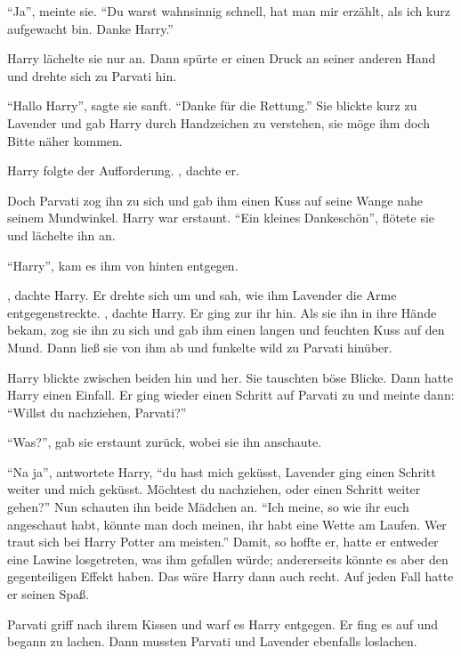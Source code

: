 \enquote{Ja}, meinte sie. \enquote{Du warst wahnsinnig schnell, hat man mir erzählt, als ich kurz aufgewacht bin. Danke Harry.}

Harry lächelte sie nur an. Dann spürte er einen Druck an seiner anderen Hand und drehte sich zu Parvati hin.

\enquote{Hallo Harry}, sagte sie sanft. \enquote{Danke für die Rettung.} Sie blickte kurz zu Lavender und gab Harry durch Handzeichen zu verstehen, sie möge ihm doch Bitte näher kommen.

Harry folgte der Aufforderung. , dachte er.

Doch Parvati zog ihn zu sich und gab ihm einen Kuss auf seine Wange nahe seinem Mundwinkel. Harry war erstaunt. \enquote{Ein kleines Dankeschön}, flötete sie und lächelte ihn an.

\enquote{Harry}, kam es ihm von hinten entgegen.

, dachte Harry. Er drehte sich um und sah, wie ihm Lavender die Arme entgegenstreckte. , dachte Harry. Er ging zur ihr hin. Als sie ihn in ihre Hände bekam, zog sie ihn zu sich und gab ihm einen langen und feuchten Kuss auf den Mund. Dann ließ sie von ihm ab und funkelte wild zu Parvati hinüber.

Harry blickte zwischen beiden hin und her. Sie tauschten böse Blicke. Dann hatte Harry einen Einfall. Er ging wieder einen Schritt auf Parvati zu und meinte dann: \enquote{Willst du nachziehen, Parvati?}

\enquote{Was?}, gab sie erstaunt zurück, wobei sie ihn anschaute.

\enquote{Na ja}, antwortete Harry, \enquote{du hast mich  geküsst, Lavender ging einen Schritt weiter und  mich geküsst. \gst Möchtest du nachziehen, oder einen Schritt weiter gehen?} Nun schauten ihn beide Mädchen an. \enquote{Ich meine, so wie ihr euch angeschaut habt, könnte man doch meinen, ihr habt eine Wette am Laufen. Wer traut sich bei Harry Potter am meisten.} Damit, so hoffte er, hatte er entweder eine Lawine losgetreten, was ihm gefallen würde; andererseits könnte es aber den gegenteiligen Effekt haben. Das wäre Harry dann auch recht. Auf jeden Fall hatte er seinen Spaß.

Parvati griff nach ihrem Kissen und warf es Harry entgegen. Er fing es auf und begann zu lachen. Dann mussten Parvati und Lavender ebenfalls loslachen.

